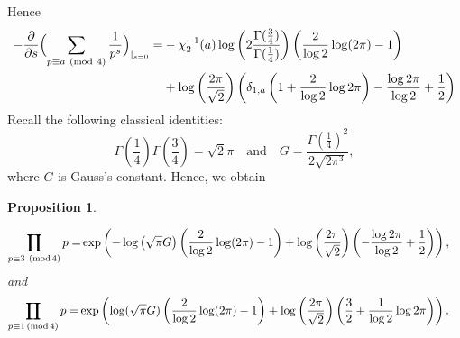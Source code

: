 \documentclass[12pt]{amsart}
\DeclareMathOperator*\Rprod{%
\mathchoice
  {\ooalign{$\displaystyle\prod$\cr\hidewidth$\displaystyle\coprod$\hidewidth\cr}}%
  {\ooalign{$\textstyle\prod$\cr\hidewidth$\textstyle\coprod$\hidewidth\cr}}%
  {\ooalign{$\scriptstyle\prod$\cr\hidewidth$\scriptstyle\coprod$\hidewidth\cr}}%
  {\ooalign{$\scriptscriptstyle\prod$\cr\hidewidth$%
  \scriptscriptstyle\coprod$\hidewidth\cr}}}
\newtheorem{proposition}[theorem]{Proposition}
\newcommand{\pt}{\partial}
\begin{document}
Hence
 \[
 \begin{split}
-\frac{\pt}{\pt s} \Bigl( \sum_{p\equiv a \ (\text{mod} \ 4)} \frac{1}{p^s} \Bigr)_{|_{s=0}}
=& -\chi_2^{-1}(a)\log \left( 2\frac{\Gamma(\frac{3}{4})}{\Gamma(\frac{1}{4})}\right)\left(\frac{2}{\log 2}\log (2\pi)-1 \right) \\
 &+\log \left( \frac{2\pi}{\sqrt{2}}\right) \left( \delta_{1,a} \left( 1+\frac{2}{\log 2} \log 2\pi\right) -\frac{\log 2\pi}{\log 2}+\frac{1}{2} \right)
 \end{split}
 \]
 Recall the following classical identities: 
\[
\Gamma(\frac{1}{4}) \Gamma(\frac{3}{4})=\sqrt{2}\pi \quad \text{and}\quad G=\frac{\Gamma(\frac{1}{4})^2}{ 2\sqrt{2\pi^3}},
\]
where $G$ is Gauss's constant. Hence, we obtain
\begin{proposition}\label{m=4}

 
  \[
 \begin{split}
 \Rprod_{p \equiv 3\ (\mathrm{mod}\,{4})} p
=& \exp\left(-\log \left( {\sqrt{\pi}G} \right)\left(\frac{2}{\log 2}\log (2\pi)-1 \right) 
 +\log \left( \frac{2\pi}{\sqrt{2}}\right) \left(  -\frac{\log 2\pi}{\log 2}+\frac{1}{2} \right)\right),
 \end{split}
 \]
 and
 \[
 \begin{split}
 \Rprod_{p \equiv 1 \, (\mathrm{mod}\, 4)} p
=& \exp\left(\log({\sqrt{\pi}G})\left(\frac{2}{\log 2}\log (2\pi)-1 \right) 
 +\log \left( \frac{2\pi}{\sqrt{2}}\right) \left(   \frac{3}{2}+\frac{1}{\log 2} \log 2\pi \right)\right).
 \end{split}
 \]

\end{proposition}
\end{document}
